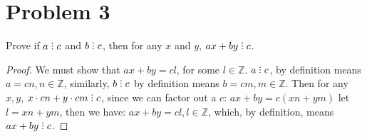 \documentclass[12pt]{article}
\title{\scalebox{2}{Math 341 Exam 1}}
\author{\scalebox{1.5}{Theo Koss}}
\date{September 2020}
\newcommand{\Z}{\mathbb{Z}}
\newcommand{\divby}{%
  \mathrel{\text{\vbox{\baselineskip.65ex\lineskiplimit0pt\hbox{.}\hbox{.}\hbox{.}}}}%
  }
\begin{document}
\maketitle
\section{Problem 3}
Prove if $a\divby c$ and $b\divby c$, then for any $x$ and $y$, $ax+by\divby c$.
\begin{proof}
We must show that $ax+by=cl$, for some $l\in\Z$. $a\divby c$, by definition means $a=cn, n\in\Z$, similarly, $b\divby c$ by definition means $b=cm, m\in\Z$. Then for any $x,y$, $x\cdot cn+y\cdot cm \divby c$, since we can factor out a $c$: $ax+by=c(xn+ym)$ let $l=xn+ym$, then we have: $ax+by=cl, l\in\Z$, which, by definition, means $ax+by\divby c$.
\end{proof}
\end{document}
